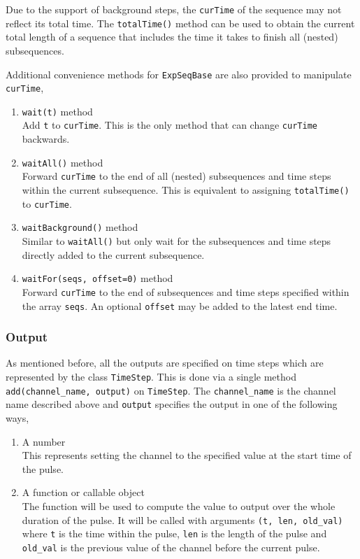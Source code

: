 Due to the support of background steps, the \lstinline{curTime} of the sequence
may not reflect its total time.
The \lstinline{totalTime()} method can be used to obtain
the current total length of a sequence that includes the time it takes to finish
all (nested) subsequences.

Additional convenience methods for \lstinline{ExpSeqBase} are also provided
to manipulate \lstinline{curTime},
\begin{enumerate}
\item \lstinline{wait(t)} method\\
  Add \lstinline{t} to \lstinline{curTime}.
  This is the only method that can change \lstinline{curTime} backwards.
\item \lstinline{waitAll()} method\\
  Forward \lstinline{curTime} to the end of all (nested) subsequences and time steps
  within the current subsequence.
  This is equivalent to assigning \lstinline{totalTime()} to \lstinline{curTime}.
\item \lstinline{waitBackground()} method\\
  Similar to \lstinline{waitAll()} but only wait for the subsequences and time steps
  directly added to the current subsequence.
\item \lstinline{waitFor(seqs, offset=0)} method\\
  Forward \lstinline{curTime} to the end of subsequences and time steps specified
  within the array \lstinline{seqs}.
  An optional \lstinline{offset} may be added to the latest end time.
\end{enumerate}

\subsubsection{Output}

As mentioned before, all the outputs are specified on time steps
which are represented by the class \lstinline{TimeStep}.
This is done via a single method \lstinline{add(channel_name, output)} on \lstinline{TimeStep}.
The \lstinline{channel_name} is the channel name described above
and \lstinline{output} specifies the output in one of the following ways,
\begin{enumerate}
\item A number\\
  This represents setting the channel to the specified value at the start time of the pulse.
\item A function or callable object\\
  The function will be used to compute the value to output over the whole duration of the pulse.
  It will be called with arguments \lstinline{(t, len, old_val)} where
  \lstinline{t} is the time within the pulse, \lstinline{len} is the length of the pulse
  and \lstinline{old_val} is the previous value of the channel before the current pulse.
\end{enumerate}

